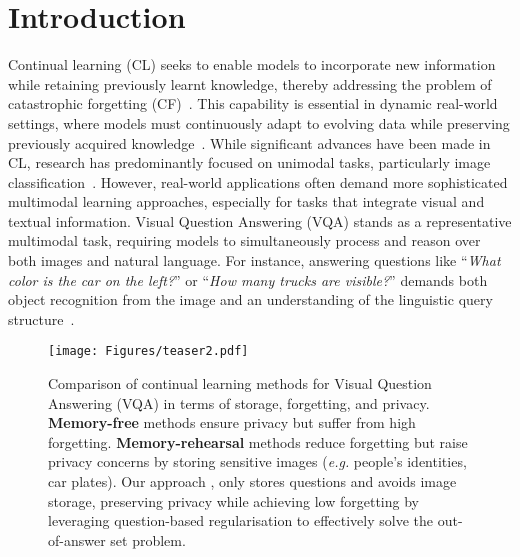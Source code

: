 \section{Introduction}
\label{sec:introduction}
Continual learning (CL) seeks to enable models to incorporate new information while retaining previously learnt knowledge, thereby addressing the problem of catastrophic forgetting (CF)~\citep{mcclelland1995there, mccloskey1989catastrophic}. This capability is essential in dynamic real-world settings, where models must continuously adapt to evolving data while preserving previously acquired knowledge~\citep{zhang2023vqacl}. While significant advances have been made in CL, research has predominantly focused on unimodal tasks, particularly image classification~\citep{wang2022dualprompt, wang2022continual, kirkpatrick2017overcoming, NEURIPS2023_15294ba2, marouf2024weightedensemblemodelsstrong, zhou2024expandable}. However, real-world applications often demand more sophisticated multimodal learning approaches, especially for tasks that integrate visual and textual information. Visual Question Answering (VQA) stands as a representative multimodal task, requiring models to simultaneously process and reason over both images and natural language. For instance, answering questions like ``\textit{What color is the car on the left?}'' or ``\textit{How many trucks are visible?}'' demands both object recognition from the image and an understanding of the linguistic query structure~\citep{zhang2023vqacl, schwenk2022okvqa, yang2022zero, cheng2023vindlu, Wang_2023_ICCV}.

\begin{figure}
    \centering
    \texttt{[image: Figures/teaser2.pdf]}
    \vspace{-7mm}
    \caption{Comparison of continual learning methods for Visual Question Answering (VQA) in terms of storage, forgetting, and privacy. \textbf{Memory-free} methods ensure privacy but suffer from high forgetting. \textbf{Memory-rehearsal} methods reduce forgetting but raise privacy concerns by storing sensitive images (\textit{e.g.} people's identities, car plates). Our approach \textbf{\qstmethodshort{}}, only stores questions and avoids image storage, preserving privacy while achieving low forgetting by leveraging question-based regularisation to effectively solve the out-of-answer set problem.}
    \vspace{-3mm}
    \label{fig.teaser}
\end{figure}


